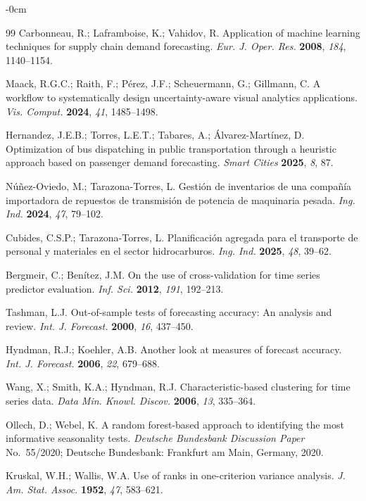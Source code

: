 \documentclass[forecasting,article,submit,pdftex,moreauthors]{Definitions/mdpi}
\begin{document}
\begin{adjustwidth}{-\extralength}{0cm}
\begin{thebibliography}{99}
Carbonneau, R.; Laframboise, K.; Vahidov, R. Application of machine learning techniques for supply chain demand forecasting. \textit{Eur. J. Oper. Res.} \textbf{2008}, \textit{184}, 1140--1154.

Maack, R.G.C.; Raith, F.; P\'{e}rez, J.F.; Scheuermann, G.; Gillmann, C. A workflow to systematically design uncertainty-aware visual analytics applications. \textit{Vis. Comput.} \textbf{2024}, \textit{41}, 1485--1498.

Hernandez, J.E.B.; Torres, L.E.T.; Tabares, A.; \'{A}lvarez-Mart\'{i}nez, D. Optimization of bus dispatching in public transportation through a heuristic approach based on passenger demand forecasting. \textit{Smart Cities} \textbf{2025}, \textit{8}, 87.

N\'{u}\~{n}ez-Oviedo, M.; Tarazona-Torres, L. Gesti\'{o}n de inventarios de una compa\~{n}\'{i}a importadora de repuestos de transmisi\'{o}n de potencia de maquinaria pesada. \textit{Ing. Ind.} \textbf{2024}, \textit{47}, 79--102.

Cubides, C.S.P.; Tarazona-Torres, L. Planificaci\'{o}n agregada para el transporte de personal y materiales en el sector hidrocarburos. \textit{Ing. Ind.} \textbf{2025}, \textit{48}, 39--62.

Bergmeir, C.; Ben\'{i}tez, J.M. On the use of cross-validation for time series predictor evaluation. \textit{Inf. Sci.} \textbf{2012}, \textit{191}, 192--213.

Tashman, L.J. Out-of-sample tests of forecasting accuracy: An analysis and review. \textit{Int. J. Forecast.} \textbf{2000}, \textit{16}, 437--450.

Hyndman, R.J.; Koehler, A.B. Another look at measures of forecast accuracy. \textit{Int. J. Forecast.} \textbf{2006}, \textit{22}, 679--688.

Wang, X.; Smith, K.A.; Hyndman, R.J. Characteristic-based clustering for time series data. \textit{Data Min. Knowl. Discov.} \textbf{2006}, \textit{13}, 335--364.

Ollech, D.; Webel, K. A random forest-based approach to identifying the most informative seasonality tests. \textit{Deutsche Bundesbank Discussion Paper} No.\ 55/2020; Deutsche Bundesbank: Frankfurt am Main, Germany, 2020.

Kruskal, W.H.; Wallis, W.A. Use of ranks in one-criterion variance analysis. \textit{J. Am. Stat. Assoc.} \textbf{1952}, \textit{47}, 583--621.


\end{thebibliography}
\end{adjustwidth}
\end{document}
